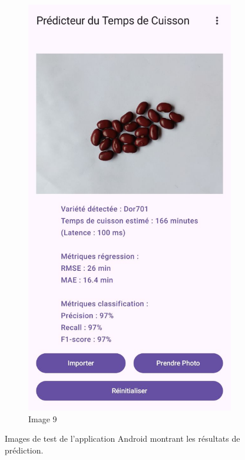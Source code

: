 \begin{figure}[H]
    \begin{subfigure}{0.24\textwidth}
        \centering
        \includegraphics[width=\linewidth]{figures/test9.jpg}
        \caption{Image 9}
    \end{subfigure}


    \caption{Images de test de l’application Android montrant les résultats de prédiction.}
    \label{fig:test_android}
\end{figure}
